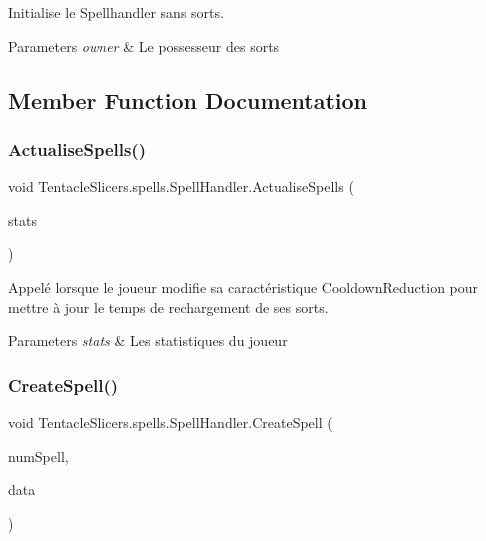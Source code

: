 Initialise le Spellhandler sans sorts. 


\begin{DoxyParams}{Parameters}
{\em owner} & Le possesseur des sorts \\
\hline
\end{DoxyParams}


\subsection{Member Function Documentation}
\mbox{\label{class_tentacle_slicers_1_1spells_1_1_spell_handler_a6ac92e59c19c60376e248d277b2fa193}} 
\subsubsection{\texorpdfstring{Actualise\+Spells()}{ActualiseSpells()}}
{\footnotesize\ttfamily void Tentacle\+Slicers.\+spells.\+Spell\+Handler.\+Actualise\+Spells (\begin{DoxyParamCaption}\item[{\hyperlink{class_tentacle_slicers_1_1actors_1_1_player_stats}{Player\+Stats}}]{stats }\end{DoxyParamCaption})}



Appelé lorsque le joueur modifie sa caractéristique Cooldown\+Reduction pour mettre à jour le temps de rechargement de ses sorts. 


\begin{DoxyParams}{Parameters}
{\em stats} & Les statistiques du joueur \\
\hline
\end{DoxyParams}
\mbox{\label{class_tentacle_slicers_1_1spells_1_1_spell_handler_a21bcc65c646df5c305e7c92ab31341b6}} 
\subsubsection{\texorpdfstring{Create\+Spell()}{CreateSpell()}\hspace{0.1cm}{\footnotesize\ttfamily [1/2]}}
{\footnotesize\ttfamily void Tentacle\+Slicers.\+spells.\+Spell\+Handler.\+Create\+Spell (\begin{DoxyParamCaption}\item[{int}]{num\+Spell,  }\item[{\hyperlink{class_tentacle_slicers_1_1spells_1_1_spell_data}{Spell\+Data}}]{data }\end{DoxyParamCaption})}



